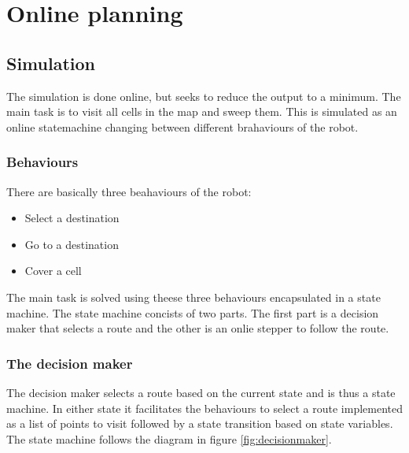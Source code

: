 \chapter{Online planning}\label{chap:online planning}

\section{ Simulation }
The simulation is done online, but seeks to reduce the output to a minimum. The
main task is to visit all cells in the map and sweep them. This is simulated as
an online statemachine changing between different brahaviours of the robot.

\subsection{Behaviours}
There are basically three beahaviours of the robot:

\begin{itemize}
  \item Select a destination
  \item Go to a destination
  \item Cover a cell
\end{itemize}

The main task is solved using theese three behaviours encapsulated in a state
machine. The state machine concists of two parts. The first part is a decision
maker that selects a route and the other is an onlie stepper to follow the
route.

\subsection{The decision maker}
The decision maker selects a route based on the current state and is thus a
state machine. In either state it facilitates the behaviours to select a route
implemented as a list of points to visit followed by a state transition based on
state variables. The state machine follows the diagram in figure
\ref{fig:decisionmaker}.

